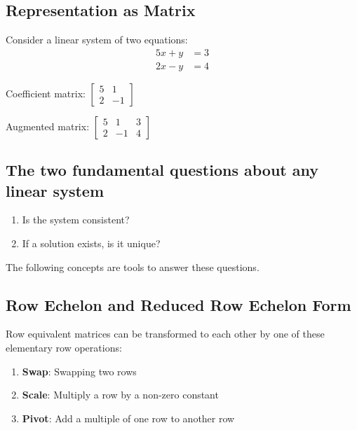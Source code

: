 \documentclass[../linear-algebra.tex]{subfiles}
\begin{document}
\subsection{Representation as Matrix}
\noindent Consider a linear system of two equations:
\begin{align*}
    5x + y &= 3 \\
    2x - y &= 4
\end{align*}

\noindent Coefficient matrix:
$\begin{bmatrix} 
    5 & 1 \\ 
    2 & -1 
\end{bmatrix}$

\medskip

\noindent Augmented matrix:
$\begin{bmatrix} 
    5 & 1 & 3 \\ 
    2 & -1 & 4 
\end{bmatrix}$

\subsection{The two fundamental questions about any linear system}
\begin{enumerate}
    \item Is the system consistent?
    \item If a solution exists, is it unique?
\end{enumerate}
The following concepts are tools to answer these questions.

\subsection{Row Echelon and Reduced Row Echelon Form}
Row equivalent matrices can be transformed to each other 
by one of these elementary row operations:
\begin{enumerate}
    \item \textbf{Swap}: Swapping two rows
    \item \textbf{Scale}: Multiply a row by a non-zero constant
    \item \textbf{Pivot}: Add a multiple of one row to another row
\end{enumerate}
\end{document}
